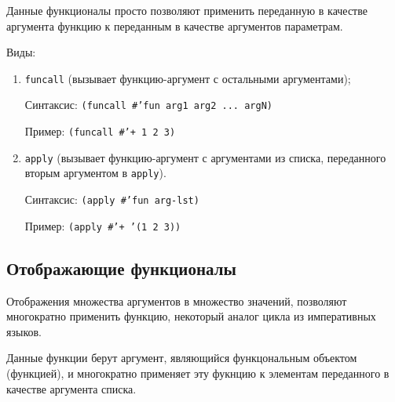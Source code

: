 Данные функционалы просто позволяют применить переданную в качестве аргумента функцию к переданным в качестве аргументов параметрам.

Виды:
\begin{enumerate}
    \item \texttt{funcall} (вызывает функцию-аргумент с остальными аргументами);
        
        Синтаксис: \texttt{(funcall \#'fun arg1 arg2 ... argN)}

        Пример: \texttt{(funcall \#'+ 1 2 3)}

    \item \texttt{apply} (вызывает функцию-аргумент с аргументами из списка, переданного вторым аргументом в \texttt{apply}).

        Синтаксис: \texttt{(apply \#'fun arg-lst)}

        Пример: \texttt{(apply \#'+ '(1 2 3))}
\end{enumerate}

\subsection{Отображающие функционалы} 

Отображения множества аргументов в множество значений, позволяют многократно применить функцию, некоторый аналог цикла из императивных языков.

Данные функции берут аргумент, являющийся функцональным объектом (функцией), и многократно применяет эту фукнцию к элементам переданного в качестве аргумента списка.

